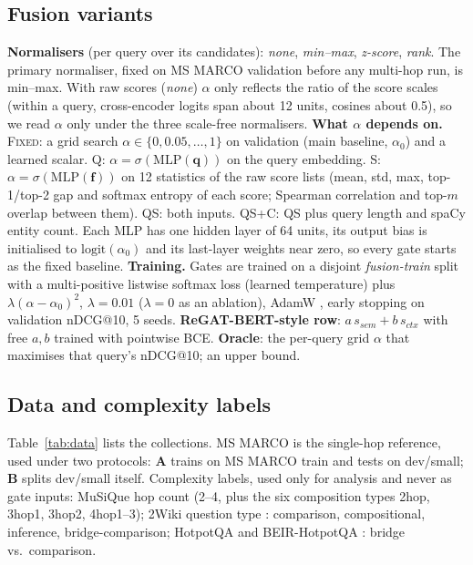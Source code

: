 \documentclass[11pt]{article}
\newcommand{\sem}{s_{\mathit{sem}}}
\newcommand{\ctx}{s_{\mathit{ctx}}}
\newcommand{\gate}[1]{\textsc{#1}}
\begin{document}
\subsection{Fusion variants}
\textbf{Normalisers} (per query over its candidates): \emph{none}, \emph{min--max}, \emph{z-score},
\emph{rank}. The primary normaliser, fixed on MS MARCO validation before any multi-hop run, is
min--max. With raw scores (\emph{none}) $\alpha$ only reflects the ratio of the score scales (within a
query, cross-encoder logits span about 12 units, cosines about 0.5), so we read $\alpha$ only under the
three scale-free normalisers.
\textbf{What $\alpha$ depends on.}
\gate{Fixed}: a grid search $\alpha\in\{0,0.05,\dots,1\}$ on validation (main baseline, $\alpha_0$)
and a learned scalar.
\gate{Q}: $\alpha=\sigma(\mathrm{MLP}(\mathbf{q}))$ on the query embedding.
\gate{S}: $\alpha=\sigma(\mathrm{MLP}(\mathbf{f}))$ on 12 statistics of the raw score lists (mean, std,
max, top-1/top-2 gap and softmax entropy of each score; Spearman correlation and top-$m$ overlap
between them).
\gate{QS}: both inputs. \gate{QS+C}: \gate{QS} plus query length and spaCy entity count.
Each MLP has one hidden layer of 64 units, its output bias is initialised to $\mathrm{logit}(\alpha_0)$
and its last-layer weights near zero, so every gate starts as the fixed baseline.
\textbf{Training.} Gates are trained on a disjoint \emph{fusion-train} split with a multi-positive
listwise softmax loss \citep{cao2007listnet} (learned temperature) plus $\lambda(\alpha-\alpha_0)^2$,
$\lambda{=}0.01$ ($\lambda{=}0$ as an ablation), AdamW \citep{loshchilov2019adamw}, early stopping on
validation nDCG@10, 5 seeds.
\textbf{ReGAT-BERT-style row}: $a\,\sem + b\,\ctx$ with free $a,b$ trained with pointwise BCE.
\textbf{Oracle}: the per-query grid $\alpha$ that maximises that query's nDCG@10; an upper bound.

\subsection{Data and complexity labels}
Table~\ref{tab:data} lists the collections. MS MARCO \citep{nguyen2016msmarco} is the single-hop
reference, used under two protocols: \textbf{A} trains on MS MARCO train and tests on dev/small;
\textbf{B} splits dev/small itself. Complexity labels, used only for analysis and never as gate
inputs: MuSiQue hop count (2--4, plus the six composition types 2hop, 3hop1, 3hop2, 4hop1--3);
2Wiki question type \citep{ho2020constructing}: comparison, compositional, inference, bridge-comparison;
HotpotQA and BEIR-HotpotQA \citep{thakur2021beir}: bridge vs.\ comparison.
\end{document}

